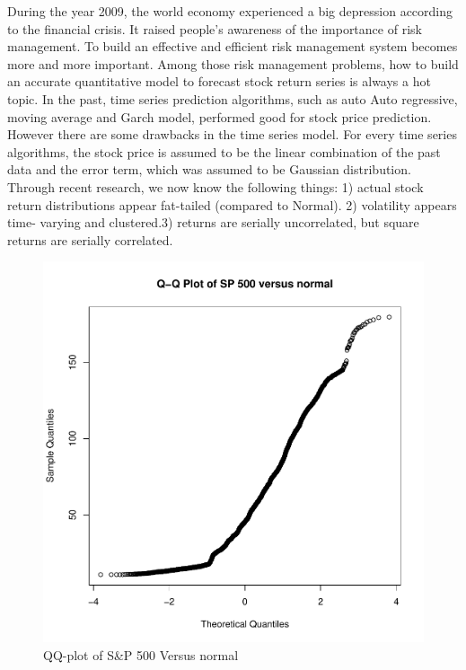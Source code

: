 \documentclass[12pt]{article}
\theoremstyle{plain}
\begin{document}
During the year 2009, the world economy experienced a big depression according to the financial crisis. It raised people's awareness of the importance of risk management. To build an effective and efficient risk management system becomes more and more important. Among those risk management problems, how to build an accurate quantitative model to forecast stock return series is always a hot topic. In the past, time series prediction algorithms, such as auto Auto regressive, moving average and Garch model, performed good for stock price prediction. However there are some drawbacks in the time series model. For every time series algorithms, the stock price is assumed to be the linear combination of the past data and the error term, which was assumed to be Gaussian distribution. Through recent research, we now know the following things: 1) actual stock return distributions appear fat-tailed (compared to Normal). 2) volatility appears time- varying and clustered.3) returns are serially uncorrelated, but square returns are serially correlated. 
\begin{figure}[!htb]
\centering
\includegraphics[scale=0.50]{sp.pdf}
\caption{\label{graph:pdf1} QQ-plot of S\&P 500 Versus normal}
\end{figure}
\end{document}
